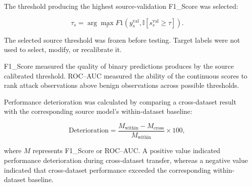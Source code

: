 The threshold producing the highest source-validation F1\_Score was selected:


\begin{equation}
       \tau_s = 
       \arg\max_{\tau}
       F1\left(
                y_s^{\mathrm{val}},
                \mathbb{I}
                \left[
                    s_s^{\mathrm{val}}\geq\tau
                \right]
        \right).
        \label{eq:threshold-selection}
\end{equation}

The selected source threshold was frozen before testing. Target labels were not used to select, modify, or recalibrate it.

F1\_Score measured the quality of binary predictions produces by the source calibrated threshold. ROC--AUC measured the ability of the continuous scores to rank attack observations above benign observations across possible thresholds.

Performance deterioration was calculated by comparing a cross-dataset result with the corresponding source model's within-dataset baseline:

\begin{equation}
       \mathrm{Deterioration} =
       \frac{
            M_{\mathrm{within}}-M_{\mathrm{cross}}
        }{
            M_{\mathrm{within}}
        }
        \times100, 
        \label{eq:method-deterioration}
\end{equation}

where \(M\) represents F1\_Score or ROC--AUC. A positive value indicated performance deterioration during cross-dataset transfer, whereas a negative value indicated that cross-dataset performance exceeded the corresponding within-dataset baseline.

